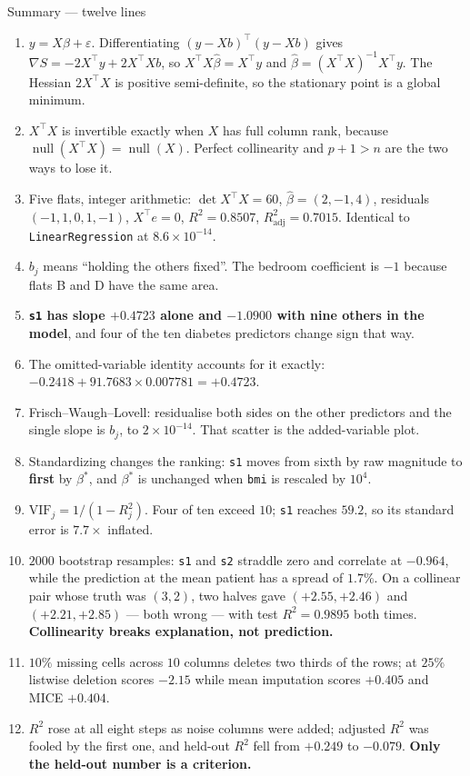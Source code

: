 \documentclass[aspectratio=169]{beamer}
\newcommand{\Xt}{X^{\!\top}}
\begin{document}
\begin{frame}[shrink=16]{Summary --- twelve lines}
  \begin{enumerate}\small
    \item $y = X\beta + \varepsilon$. Differentiating
      $(y-Xb)^{\!\top}(y-Xb)$ gives $\nabla S = -2\Xt y + 2\Xt X b$, so
      $\Xt X\hat\beta = \Xt y$ and $\hat\beta = (\Xt X)^{-1}\Xt y$. The
      Hessian $2\Xt X$ is positive semi-definite, so the stationary point is
      a global minimum.
    \item $\Xt X$ is invertible exactly when $X$ has full column rank,
      because $\operatorname{null}(\Xt X) = \operatorname{null}(X)$. Perfect
      collinearity and $p+1 > n$ are the two ways to lose it.
    \item Five flats, integer arithmetic: $\det \Xt X = 60$,
      $\hat\beta = (2, -1, 4)$, residuals $(-1, 1, 0, 1, -1)$,
      $\Xt e = 0$, $R^2 = 0.8507$, $R^2_{\text{adj}} = 0.7015$. Identical to
      \texttt{LinearRegression} at $8.6\times10^{-14}$.
    \item $b_j$ means ``holding the others fixed''. The bedroom coefficient
      is $-1$ because flats B and D have the same area.
    \item \textbf{\texttt{s1} has slope $+0.4723$ alone and $-1.0900$ with
      nine others in the model}, and four of the ten diabetes predictors
      change sign that way.
    \item The omitted-variable identity accounts for it exactly:
      $-0.2418 + 91.7683 \times 0.007781 = +0.4723$.
    \item Frisch--Waugh--Lovell: residualise both sides on the other
      predictors and the single slope is $b_j$, to $2\times10^{-14}$. That
      scatter is the added-variable plot.
    \item Standardizing changes the ranking: \texttt{s1} moves from sixth by
      raw magnitude to \textbf{first} by $\beta^*$, and $\beta^*$ is
      unchanged when \texttt{bmi} is rescaled by $10^{4}$.
    \item $\mathrm{VIF}_j = 1/(1-R_j^2)$. Four of ten exceed $10$;
      \texttt{s1} reaches $59.2$, so its standard error is $7.7\times$
      inflated.
    \item $2000$ bootstrap resamples: \texttt{s1} and \texttt{s2} straddle
      zero and correlate at $-0.964$, while the prediction at the mean
      patient has a spread of $1.7\%$. On a collinear pair whose truth was
      $(3,2)$, two halves gave $(+2.55,+2.46)$ and $(+2.21,+2.85)$ --- both
      wrong --- with test $R^2 = 0.9895$ both times.
      \textbf{Collinearity breaks explanation, not prediction.}
    \item $10\%$ missing cells across $10$ columns deletes two thirds of the
      rows; at $25\%$ listwise deletion scores $\mathbf{-2.15}$ while mean
      imputation scores $+0.405$ and MICE $+0.404$.
    \item $R^2$ rose at all eight steps as noise columns were added; adjusted
      $R^2$ was fooled by the first one, and held-out $R^2$ fell from
      $+0.249$ to $-0.079$. \textbf{Only the held-out number is a criterion.}
  \end{enumerate}
\end{frame}
\end{document}

